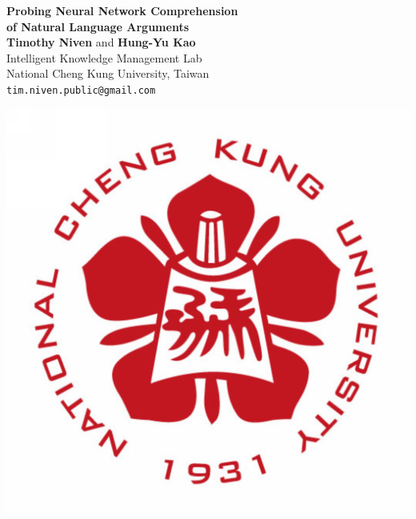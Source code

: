 \documentclass[a0,portrait]{a0poster}
\begin{document}


\begin{minipage}[b]{0.75\linewidth}
\VeryHuge \color{NavyBlue} \textbf{Probing Neural Network Comprehension \\
of Natural Language Arguments} \color{Black}\\[0.5cm] %
\huge \textbf{Timothy Niven} and \textbf{Hung-Yu Kao}\\[0.5cm] %
\huge 
Intelligent Knowledge Management Lab \\[0.5cm]
National Cheng Kung University, Taiwan\\[0.4cm] %
\Large \texttt{tim.niven.public@gmail.com}\\
\end{minipage}
%
\begin{minipage}[b]{0.25\linewidth}
\includegraphics[width=17.5cm]{NCKU_Logo_2011.png}
\end{minipage}
\end{document}
